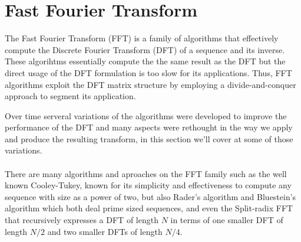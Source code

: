 \documentclass[
  oneside,
  11pt, a4paper,
  footinclude=true,
  headinclude=true,
  cleardoublepage=empty
]{scrbook}
\begin{document}
\section{Fast Fourier Transform} \label{sec:fast-fourier-transform}

The Fast Fourier Transform (FFT) is a family of algorithms that effectively compute the Discrete Fourier Transform (DFT) of a sequence and its inverse. These algorihtms essentially compute the the same result as the DFT but the direct usage of the DFT formulation is too slow for its applications. Thus, FFT algorithms exploit the DFT matrix structure by employing a divide-and-conquer approach \cite{chu1999inside} to segment its application.

Over time serveral variations of the algorithms were developed to improve the performance of the DFT and many aspects were rethought in the way we apply and produce the resulting transform, in this section we'll cover at some of those variations. %



\paragraph{}
There are many algorithms and aproaches on the FFT family such as the well known Cooley-Tukey, known for its simplicity and effectiveness to compute any sequence with size as a power of two, but also Rader's algorithm \cite{rader1968discrete} and Bluestein's algorithm \cite{bluestein1970linear} which both deal prime sized sequences, and even the Split-radix FFT \cite{yavne1968economical} that recursively expresses a DFT of length \(N\) in terms of one smaller DFT of length \(N/2\) and two smaller DFTs of length \(N/4\). 
\end{document}
